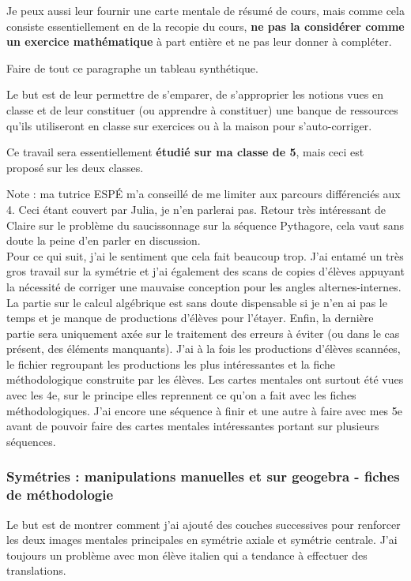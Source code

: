 Je peux aussi leur fournir une carte mentale de résumé de cours, mais comme cela consiste essentiellement en de la recopie du cours, \textbf{ne pas la considérer comme un exercice mathématique} à part entière et ne pas leur donner à compléter.

{\color{red}Faire de tout ce paragraphe un tableau synthétique.}

Le but est de leur permettre de s'emparer, de s'approprier les notions vues en classe et de leur constituer {\color{red}(ou apprendre à constituer)} une banque de ressources qu'ils utiliseront en classe sur exercices ou à la maison pour s'auto-corriger.

Ce travail sera essentiellement \textbf{étudié sur ma classe de 5}, mais ceci est proposé sur les deux classes.

Note : ma tutrice ESPÉ m'a conseillé de me limiter aux parcours différenciés aux 4. Ceci étant couvert par Julia, je n'en parlerai pas. {\color{red}Retour très intéressant de Claire sur le problème du saucissonnage sur la séquence Pythagore, cela vaut sans doute la peine d'en parler en discussion.}\\

{\color{red} Pour ce qui suit, j'ai le sentiment que cela fait beaucoup trop. J'ai entamé un très gros travail sur la symétrie et j'ai également des scans de copies d'élèves appuyant la nécessité de corriger une mauvaise conception pour les angles alternes-internes. La partie sur le calcul algébrique est sans doute dispensable si je n'en ai pas le temps et je manque de productions d'élèves pour l'étayer. Enfin, la dernière partie sera uniquement axée sur le traitement des erreurs à éviter (ou dans le cas présent, des éléments manquants). J'ai à la fois les productions d'élèves scannées, le fichier regroupant les productions les plus intéressantes et la fiche méthodologique construite par les élèves. Les cartes mentales ont surtout été vues avec les 4e, sur le principe elles reprennent ce qu'on a fait avec les fiches méthodologiques. J'ai encore une séquence à finir et une autre à faire avec mes 5e avant de pouvoir faire des cartes mentales intéressantes portant sur plusieurs séquences.}

\subsubsection{Symétries : manipulations manuelles et sur geogebra - fiches de méthodologie}

Le but est de montrer comment j'ai ajouté des couches successives pour renforcer les deux images mentales principales en symétrie axiale et symétrie centrale. J'ai toujours un problème avec mon élève italien qui a tendance à effectuer des translations.

